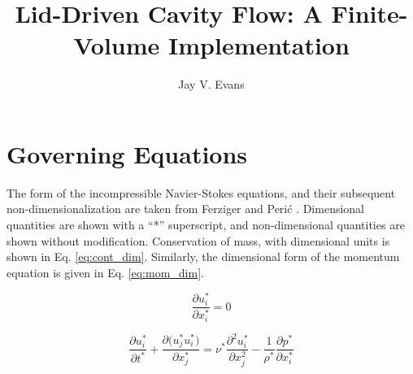\documentclass[10pt, letterpaper]{article}
\title{Lid-Driven Cavity Flow: A Finite-Volume Implementation}
\date{}
\author{Jay V. Evans}
\begin{document}
\maketitle


\section{Governing Equations}

The form of the incompressible Navier-Stokes equations, and their subsequent non-dimensionalization are taken from Ferziger and Perić \cite{Ferziger_Springer_2002}. Dimensional quantities are shown with a ``*'' superscript, and non-dimensional quantities are shown without modification. Conservation of mass, with dimensional units is shown in Eq. \ref{eq:cont_dim}. Similarly, the dimensional form of the momentum equation is given in Eq. \ref{eq:mom_dim}.

\begin{equation}
  \frac{\partial{u_{i}^{*}}}{\partial{x_{i}^{*}}} = 0
  \label{eq:cont_dim}
\end{equation}

\begin{equation}
  \frac{\partial{u_{i}^{*}}}{\partial{t^{*}}} + \frac{\partial{(u_{j}^{*}}u_{i}^{*})}{\partial{x_{j}^{*}}} ={\nu^{*}}\frac{\partial^{2}{u_{i}^{*}}}{\partial{x_{j}^{2}}} - \frac{1}{\rho^{*}}\frac{\partial{p^{*}}}{\partial{x_{i}^{*}}}
  \label{eq_mom_dim}
\end{equation}



\printbibliography{}
\end{document}
